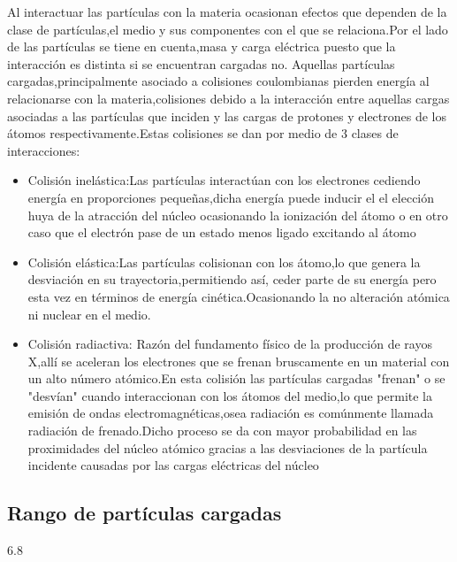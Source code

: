 \documentclass[12pt,fleqn]{book} %
\numberwithin{equation}{section} %
\numberwithin{figure}{section} %
\numberwithin{table}{section} %
\begin{document}
Al interactuar las partículas con la materia ocasionan efectos que dependen de la clase de partículas,el medio y sus componentes con el que se relaciona.Por el lado de las partículas se tiene en cuenta,masa y carga eléctrica puesto que la interacción es distinta si se encuentran cargadas no.
Aquellas partículas cargadas,principalmente asociado a colisiones coulombianas pierden energía al relacionarse con la materia,colisiones debido a la interacción entre aquellas cargas asociadas a las partículas que inciden y las cargas de protones y electrones de los átomos respectivamente.Estas colisiones se dan por medio de 3 clases de interacciones:
 
                                                                                                                                                                                                                                         
 \begin{itemize}
  \item Colisión inelástica:Las partículas interactúan con los electrones cediendo energía en proporciones pequeñas,dicha energía puede inducir el el elección huya de la atracción del núcleo ocasionando la ionización
  del átomo o en otro caso que el electrón pase de un estado menos ligado excitando al átomo
 
\item Colisión elástica:Las partículas colisionan con los átomo,lo que genera la desviación en su trayectoria,permitiendo así, ceder parte de su energía pero esta vez en términos de energía cinética.Ocasionando la no alteración atómica ni nuclear en el medio.

\item Colisión radiactiva: Razón del fundamento físico de la producción de rayos X,allí se aceleran los electrones que se frenan  bruscamente en un material con un alto número atómico.En esta colisión las partículas cargadas "frenan" o se "desvían" cuando interaccionan con los átomos del medio,lo que permite la emisión de ondas electromagnéticas,osea radiación es comúnmente llamada radiación de frenado.Dicho proceso se da con mayor probabilidad en las proximidades del núcleo atómico gracias a las desviaciones de la  partícula incidente causadas por las cargas eléctricas del núcleo

\end{itemize}

 
 \subsection{Rango de partículas cargadas }
 6.8
 
\end{document}
